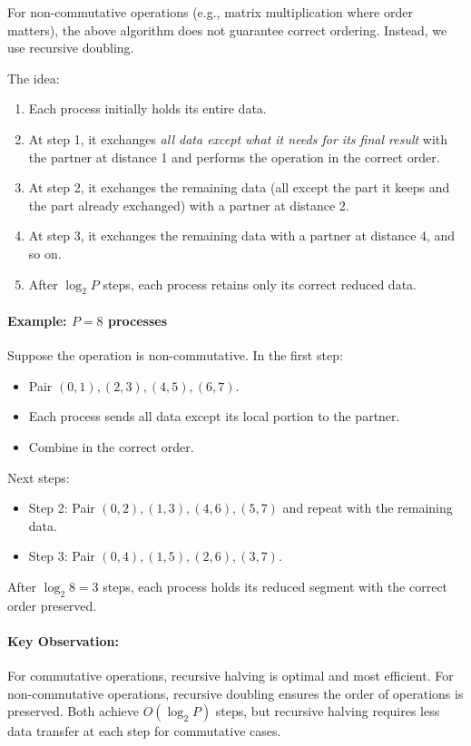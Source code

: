 \documentclass[12pt]{book}
\begin{document}
For non-commutative operations (e.g., matrix multiplication where order matters), the above algorithm does not guarantee correct ordering. Instead, we use recursive doubling.

The idea:
\begin{enumerate}
  \item Each process initially holds its entire data.
  \item At step 1, it exchanges \emph{all data except what it needs for its final result} with the partner at distance 1 and performs the operation in the correct order.
  \item At step 2, it exchanges the remaining data (all except the part it keeps and the part already exchanged) with a partner at distance 2.
  \item At step 3, it exchanges the remaining data with a partner at distance 4, and so on.
  \item After $\log_2 P$ steps, each process retains only its correct reduced data.
\end{enumerate}

\paragraph{Example: $P=8$ processes}
Suppose the operation is non-commutative. In the first step:
\begin{itemize}
  \item Pair $(0,1), (2,3), (4,5), (6,7)$.
  \item Each process sends all data except its local portion to the partner.
  \item Combine in the correct order.
\end{itemize}

Next steps:
\begin{itemize}
  \item Step 2: Pair $(0,2), (1,3), (4,6), (5,7)$ and repeat with the remaining data.
  \item Step 3: Pair $(0,4), (1,5), (2,6), (3,7)$.
\end{itemize}

After $\log_2 8=3$ steps, each process holds its reduced segment with the correct order preserved.

\paragraph{Key Observation:}
For commutative operations, recursive halving is optimal and most efficient.
For non-commutative operations, recursive doubling ensures the order of operations is preserved.
Both achieve $O(\log_2 P)$ steps, but recursive halving requires less data transfer at each step for commutative cases.
\end{document}
